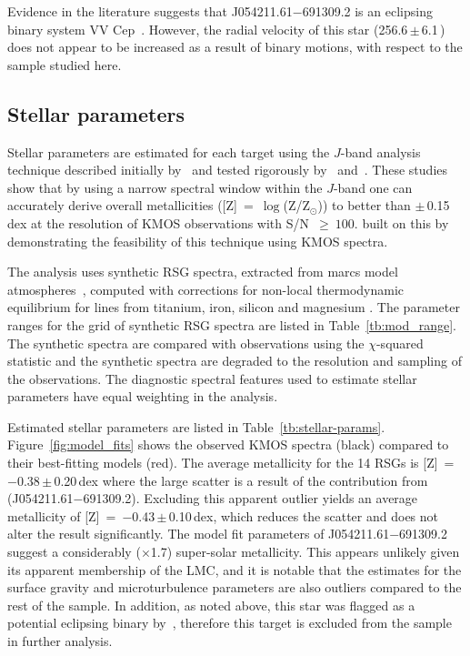 Evidence in the literature suggests that J054211.61$-$691309.2 is an eclipsing binary system VV Cep~\citep{1979MNRAS.186..831F}.
However, the radial velocity of this star (256.6\,$\pm$\,6.1\,\kms) does not appear to be increased as a result of binary motions, with respect to the sample studied here.


\subsection{Stellar parameters} %
\label{sub:stellar_parameters}

Stellar parameters are estimated for each target using the $J$-band analysis technique described initially by~\cite{2010MNRAS.407.1203D}
and tested rigorously by~\cite{2014ApJ...788...58G} and~\cite{2015ApJ...806...21D}.
These studies show that by using a narrow spectral window within the $J$-band one can accurately derive overall metallicities
([Z]~=~$\log$(Z/Z$_{\odot}$)) to better than
$\pm$\,0.15\,dex at the resolution of KMOS observations with S/N~$\ge~100$.
\cite{2015ApJ...803...14P} built on this by demonstrating the feasibility of this technique using KMOS spectra.

The analysis uses synthetic RSG spectra, extracted from {\sc marcs} model atmospheres~\citep{2008A&A...486..951G},
computed with corrections for non-local thermodynamic equilibrium for lines from titanium, iron, silicon and magnesium
\citep{2012ApJ...751..156B,2013ApJ...764..115B,2015ApJ...804..113B}.
The parameter ranges for the grid of synthetic RSG spectra are listed in Table~\ref{tb:mod_range}.
The synthetic spectra are compared with observations using the $\chi$-squared statistic and the synthetic spectra are degraded to the resolution and sampling of the observations.
The diagnostic spectral features used to estimate stellar parameters have equal weighting in the analysis.


Estimated stellar parameters are listed in Table~\ref{tb:stellar-params}.
Figure~\ref{fig:model_fits} shows the observed KMOS spectra (black) compared to their best-fitting models (red).
The average metallicity for the 14 RSGs is [Z]~=~$-$0.38\,$\pm$\,0.20\,dex where the large scatter is a result of the contribution from (J054211.61$-$691309.2).
Excluding this apparent outlier yields an average metallicity of [Z]~=~$-$0.43\,$\pm$\,0.10\,dex, which reduces the scatter and does not alter the result significantly.
The model fit parameters of J054211.61$-$691309.2 suggest a considerably ($\times$1.7) super-solar
metallicity.
This appears unlikely given its apparent membership of the LMC, and it is notable that the estimates for the surface gravity and microturbulence parameters are also outliers compared to the rest of the sample.
In addition, as noted above, this star was flagged as a potential eclipsing binary by~\citep{1979MNRAS.186..831F}, therefore this target is excluded from the sample in further analysis.

